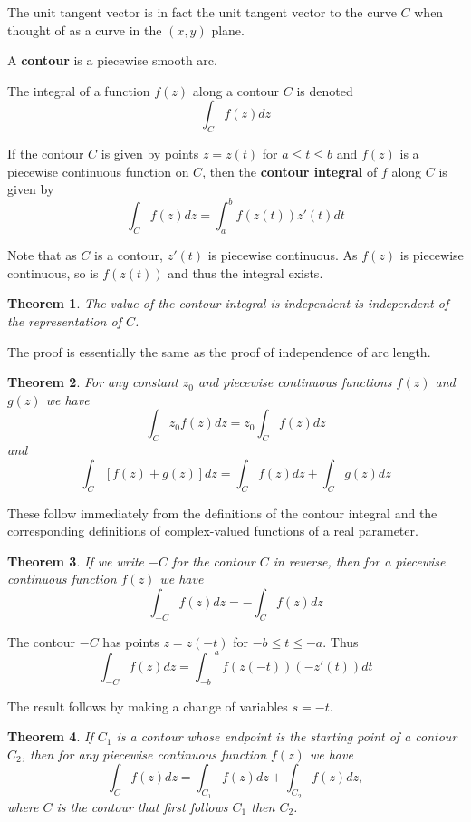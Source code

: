 \documentclass[a4paper,10pt]{article}
\newtheorem{theorem}{Theorem}[section]
\newenvironment{definition}[1][Definition]{\begin{trivlist}
\item[\hskip \labelsep {\bfseries #1}]}{\end{trivlist}}
\begin{document}
The unit tangent vector is in fact the unit tangent vector to the curve $C$ when thought of as a curve in the $(x, y)$ plane.

\begin{definition}
A \textbf{contour} is a piecewise smooth arc.
\end{definition}

The integral of a function $f(z)$ along a contour $C$ is denoted
$$\int_C f(z)dz$$

\begin{definition}
If the contour $C$ is given by points $z = z(t)$ for $a \leq t \leq b$ and $f(z)$ is a piecewise continuous function on $C$, then the \textbf{contour integral} of $f$ along $C$ is given by
$$\int_C f(z)dz = \int_a^b f(z(t))z'(t)dt$$
\end{definition}

Note that as $C$ is a contour, $z'(t)$ is piecewise continuous. As $f(z)$ is piecewise continuous, so is $f(z(t))$ and thus the integral exists.

\begin{theorem}
The value of the contour integral is independent is independent of the representation of $C$.
\end{theorem}

The proof is essentially the same as the proof of independence of arc length.

\begin{theorem}
For any constant $z_0$ and piecewise continuous functions $f(z)$ and $g(z)$ we have
$$\int_C z_0f(z)dz = z_0\int_C f(z)dz$$
and
$$\int_C [f(z) + g(z)]dz = \int_C f(z)dz + \int_C g(z) dz$$
\end{theorem}

These follow immediately from the definitions of the contour integral and the corresponding definitions of complex-valued functions of a real parameter.

\begin{theorem}
If we write $-C$ for the contour $C$ in reverse, then for a piecewise continuous function $f(z)$ we have
$$\int_{-C}f(z)dz = -\int_C f(z)dz$$
\end{theorem}

The contour $-C$ has points $z = z(-t)$ for $-b \leq t \leq -a$. Thus
$$\int_{-C}f(z)dz = \int_{-b}^{-a} f(z(-t))(-z'(t))dt$$

The result follows by making a change of variables $s = -t$.

\begin{theorem}
If $C_1$ is a contour whose endpoint is the starting point of a contour $C_2$, then for any piecewise continuous function $f(z)$ we have
$$\int_C f(z)dz = \int_{C_1}f(z)dz + \int_{C_2}f(z)dz,$$
where $C$ is the contour that first follows $C_1$ then $C_2$.
\end{theorem}
\end{document}

